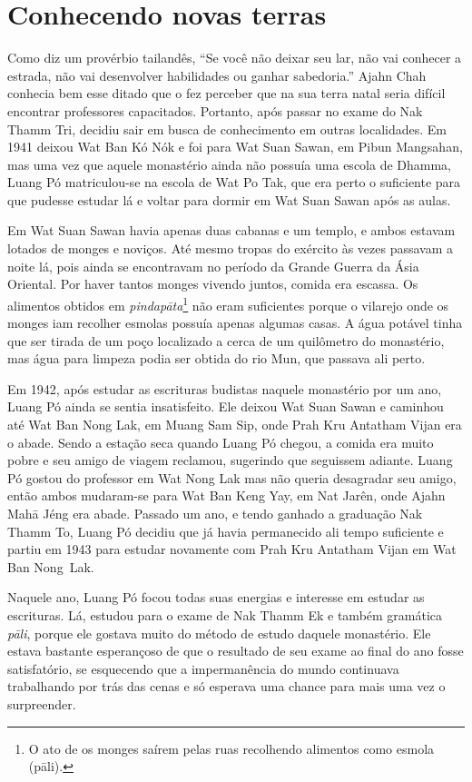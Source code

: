 \chapter{Conhecendo novas terras}

Como diz um provérbio tailandês, ``Se você não deixar seu lar, não vai
conhecer a estrada, não vai desenvolver habilidades ou ganhar
sabedoria.'' Ajahn Chah conhecia bem esse ditado que o fez perceber que
na sua terra natal seria difícil encontrar professores capacitados.
Portanto, após passar no exame do Nak Thamm Tri, decidiu sair em busca
de conhecimento em outras localidades. Em 1941 deixou Wat Ban Kó Nók e
foi para Wat Suan Sawan, em Pibun Mangsahan, mas uma vez que aquele
monastério ainda não possuía uma escola de Dhamma, Luang Pó
matriculou-se na escola de Wat Po Tak, que era perto o suficiente para
que pudesse estudar lá e voltar para dormir em Wat Suan Sawan após as
aulas.

Em Wat Suan Sawan havia apenas duas cabanas e um templo, e ambos estavam
lotados de monges e noviços. Até mesmo tropas do exército às vezes
passavam a noite lá, pois ainda se encontravam no período da Grande
Guerra da Ásia Oriental. Por haver tantos monges vivendo juntos, comida
era escassa. Os alimentos obtidos em \emph{pindapāta}\footnote{O ato de
  os monges saírem pelas ruas recolhendo alimentos como esmola (pāli).}
não eram suficientes porque o vilarejo onde os monges iam recolher
esmolas possuía apenas algumas casas. A água potável tinha que ser
tirada de um poço localizado a cerca de um quilômetro do monastério, mas
água para limpeza podia ser obtida do rio Mun, que passava ali perto.

Em 1942, após estudar as escrituras budistas naquele monastério por um
ano, Luang Pó ainda se sentia insatisfeito. Ele deixou Wat Suan Sawan e
caminhou até Wat Ban Nong Lak, em Muang Sam Sip, onde Prah Kru Antatham
Vijan era o abade. Sendo a estação seca quando Luang Pó chegou, a comida
era muito pobre e seu amigo de viagem reclamou, sugerindo que seguissem
adiante. Luang Pó gostou do professor em Wat Nong Lak mas não queria
desagradar seu amigo, então ambos mudaram-se para Wat Ban Keng Yay, em
Nat Jarên, onde Ajahn Mahā Jéng era abade. Passado um ano, e tendo
ganhado a graduação Nak Thamm To, Luang Pó decidiu que já havia
permanecido ali tempo suficiente e partiu em 1943 para estudar novamente
com Prah Kru Antatham Vijan em Wat Ban Nong~Lak.

Naquele ano, Luang Pó focou todas suas energias e interesse em estudar
as escrituras. Lá, estudou para o exame de Nak Thamm Ek e também
gramática \emph{pāli}, porque ele gostava muito do método de estudo
daquele monastério. Ele estava bastante esperançoso de que o resultado
de seu exame ao final do ano fosse satisfatório, se esquecendo que a
impermanência do mundo continuava trabalhando por trás das cenas e só
esperava uma chance para mais uma vez o surpreender.

